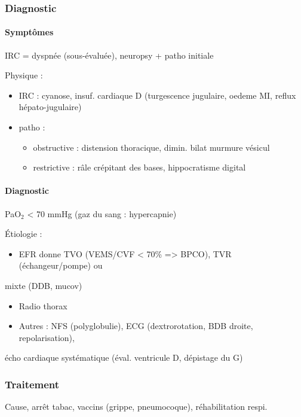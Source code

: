 \documentclass[11pt]{article}
\begin{document}
\subsubsection{Diagnostic}
\label{sec:org407304d}
\label{sec:orgf8776e2}
\paragraph{Symptômes}
\label{sec:org7b8c6de}
\label{sec:org35a8cf3}
IRC = dyspnée (sous-évaluée), neuropsy + patho initiale

Physique : 

\begin{itemize}
\item IRC : cyanose, insuf. cardiaque D (turgescence jugulaire, oedeme MI, reflux
hépato-jugulaire)
\item patho : 

\begin{itemize}
\item obstructive : distension thoracique, dimin. bilat murmure vésicul
\item restrictive : râle crépitant des bases, hippocratisme digital
\end{itemize}
\end{itemize}



\paragraph{Diagnostic}
\label{sec:org172de7e}
\label{sec:org7599c0f}
PaO\(_{\text{2}}\) < 70 mmHg (gaz du sang : hypercapnie)

Étiologie :

\begin{itemize}
\item EFR donne TVO (VEMS/CVF < 70\% => BPCO), TVR (échangeur/pompe) ou
\end{itemize}
mixte (DDB, mucov)
\begin{itemize}
\item Radio thorax
\item Autres : NFS (polyglobulie), ECG (dextrorotation, BDB droite, repolarisation),
\end{itemize}
écho cardiaque systématique (éval. ventricule D, dépistage du G)


\subsubsection{Traitement}
\label{sec:org3780f55}
\label{sec:org870a2d5}
Cause, arrêt tabac, vaccins (grippe, pneumocoque), réhabilitation respi.
\end{document}
